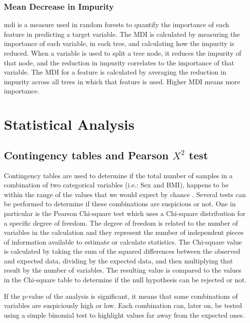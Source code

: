 \subsubsection{Mean Decrease in Impurity}

\gls{mdi} \cite{Breiman2001} is a measure used in random forests to quantify the importance of each feature in predicting a target variable. The MDI is calculated by measuring the importance of each variable, in each tree, and calculating how the impurity is reduced. When a variable is used to split a tree node, it reduces the impurity of that node, and the reduction in impurity correlates to the importance of that variable. The MDI for a feature is calculated by averaging the reduction in impurity across all trees in which that feature is used. Higher MDI means more importance.

\section{Statistical Analysis}

\subsection{Contingency tables and Pearson $X^2$ test}

Contingency tables are used to determine if the total number of samples in a combination of two categorical variables (i.e.: Sex and BMI), happens to be within the range of the values that we would expect by chance \cite{Bonamente2022}. Several tests can be performed to determine if these combinations are suspicious or not. One in particular is the Pearson Chi-square test which uses a Chi-square distribution for a specific degree of freedom. The degree of freedom is related to the number of variables in the calculation and they represent the number of independent pieces of information available to estimate or calculate statistics. The Chi-square value is calculated by taking the sum of the squared differences between the observed and expected data, dividing by the expected data, and then multiplying that result by the number of variables. The resulting value is compared to the values in the Chi-square table to determine if the null hypothesis can be rejected or not.

If the p-value of the analysis is significant, it means that some combinations of variables are suspiciously high or low. Each combination can, later on, be tested using a simple binomial test to highlight values far away from the expected ones.

